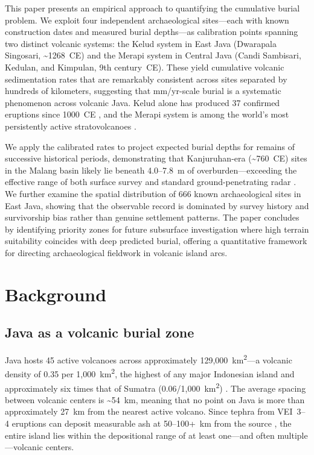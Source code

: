 \documentclass[12pt,a4paper]{article}
\begin{document}
This paper presents an empirical approach to quantifying the cumulative burial problem. We exploit four independent archaeological sites---each with known construction dates and measured burial depths---as calibration points spanning two distinct volcanic systems: the Kelud system in East Java (Dwarapala Singosari, \textasciitilde1268~CE) and the Merapi system in Central Java (Candi Sambisari, Kedulan, and Kimpulan, 9th century~CE). These yield cumulative volcanic sedimentation rates that are remarkably consistent across sites separated by hundreds of kilometers, suggesting that mm/yr-scale burial is a systematic phenomenon across volcanic Java. Kelud alone has produced 37 confirmed eruptions since 1000~CE \citep{gvp2024}, and the Merapi system is among the world's most persistently active stratovolcanoes \citep{gertisser2012}.

We apply the calibrated rates to project expected burial depths for remains of successive historical periods, demonstrating that Kanjuruhan-era (\textasciitilde760~CE) sites in the Malang basin likely lie beneath 4.0--7.8~m of overburden---exceeding the effective range of both surface survey and standard ground-penetrating radar \citep{putra2019}. We further examine the spatial distribution of 666 known archaeological sites in East Java, showing that the observable record is dominated by survey history and survivorship bias rather than genuine settlement patterns. The paper concludes by identifying priority zones for future subsurface investigation where high terrain suitability coincides with deep predicted burial, offering a quantitative framework for directing archaeological fieldwork in volcanic island arcs.

\section{Background}

\subsection{Java as a volcanic burial zone}

Java hosts 45 active volcanoes across approximately 129,000~km\textsuperscript{2}---a volcanic density of 0.35 per 1,000~km\textsuperscript{2}, the highest of any major Indonesian island and approximately six times that of Sumatra (0.06/1,000~km\textsuperscript{2}) \citep{vanbemmelen1949}. The average spacing between volcanic centers is \textasciitilde54~km, meaning that no point on Java is more than approximately 27~km from the nearest active volcano. Since tephra from VEI~3--4 eruptions can deposit measurable ash at 50--100+~km from the source \citep{newhall1982}, the entire island lies within the depositional range of at least one---and often multiple---volcanic centers.
\end{document}
